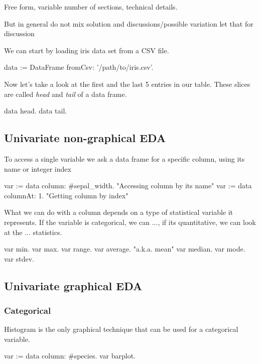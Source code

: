 \documentclass{article}
\begin{document}
Free form, variable number of sections, technical details.

But in general do not mix solution and discussions/possible variation
let that for discussion

We can start by loading iris data set from a CSV file.
\begin{code}{}
data := DataFrame fromCsv: '/path/to/iris.csv'.
\end{code}

Now let's take a look at the first and the last 5 entries in our table. These slices are called \textit{head} and \textit{tail} of a data frame.

\begin{code}{}
data head.
data tail.
\end{code}

\subsection{Univariate non-graphical EDA}
To access a single variable we ask a data frame for a specific column, using its name or integer index

\begin{code}{}
var := data column: #sepal_width. "Accessing column by its name"
var := data columnAt: 1. "Getting column by index"
\end{code}

What we can do with a column depends on a type of statistical variable it represents. If the variable is categorical, we can ..., if its quantitative, we can look at the ... statistics.

\begin{code}{}
var min.
var max.
var range.
var average. "a.k.a. mean"
var median.
var mode.
var stdev.
\end{code}

\subsection{Univariate graphical EDA}
\subsubsection{Categorical}

Histogram is the only graphical technique that can be used for a categorical variable.

\begin{code}{}
var := data column: #species.
var barplot.
\end{code}
\end{document}
